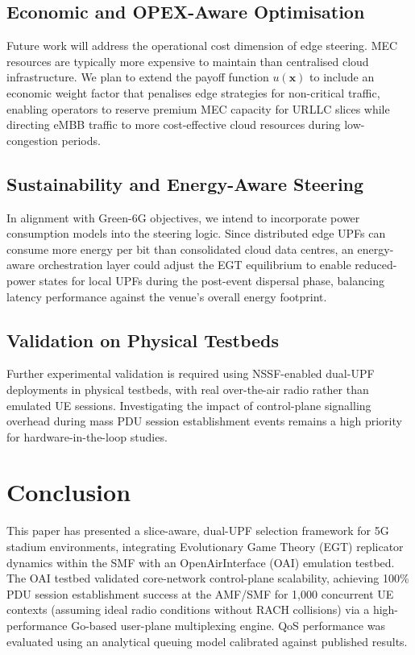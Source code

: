 \documentclass[conference]{IEEEtran}
\begin{document}
\subsection{Economic and OPEX-Aware Optimisation}

Future work will address the operational cost dimension
of edge steering. MEC resources are typically more
expensive to maintain than centralised cloud infrastructure.
We plan to extend the payoff function $u(\mathbf{x})$
to include an economic weight factor that penalises
edge strategies for non-critical traffic, enabling
operators to reserve premium MEC capacity for URLLC
slices while directing eMBB traffic to more
cost-effective cloud resources during low-congestion
periods.

\subsection{Sustainability and Energy-Aware Steering}

In alignment with Green-6G objectives, we intend to
incorporate power consumption models into the steering
logic. Since distributed edge UPFs can consume more
energy per bit than consolidated cloud data centres, an
energy-aware orchestration layer could adjust the EGT
equilibrium to enable reduced-power states for local
UPFs during the post-event dispersal phase, balancing
latency performance against the venue's overall energy
footprint.

\subsection{Validation on Physical Testbeds}

Further experimental validation is required using
NSSF-enabled dual-UPF deployments in physical testbeds,
with real over-the-air radio rather than emulated UE
sessions. Investigating the impact of control-plane
signalling overhead during mass PDU session establishment
events remains a high priority for hardware-in-the-loop
studies.

\section{Conclusion}

This paper has presented a slice-aware, dual-UPF
selection framework for 5G stadium environments,
integrating Evolutionary Game Theory (EGT) replicator
dynamics within the SMF with an OpenAirInterface (OAI)
emulation testbed. The OAI testbed validated core-network
control-plane scalability, achieving 100\% PDU session
establishment success at the AMF/SMF for 1,000 concurrent UE contexts
(assuming ideal radio conditions without RACH collisions) via a
high-performance Go-based user-plane multiplexing engine.
QoS performance was evaluated using an analytical queuing
model calibrated against published results.
\end{document}
